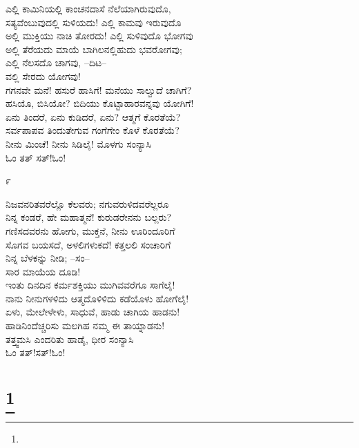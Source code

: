 \begin{myquote}
ಎಲ್ಲಿ ಕಾಮಿನಿಯಲ್ಲಿ ಕಾಂಚನದಾಸೆ ನೆಲೆಯಾಗಿರುವುದೊ,\\ಸತ್ಯವೆಂಬುವುದಲ್ಲಿ ಸುಳಿಯದು! ಎಲ್ಲಿ ಕಾಮವು ಇರುವುದೊ\\ಅಲ್ಲಿ ಮುಕ್ತಿಯು ನಾಚಿ ತೋರದು! ಎಲ್ಲಿ ಸುಳಿವುದೊ ಭೋಗವು\\ಅಲ್ಲಿ ತೆರೆಯದು ಮಾಯೆ ಬಾಗಿಲನಲ್ಲಿಹುದು ಭವರೋಗವು;\\ಎಲ್ಲಿ ನೆಲಸದೊ ಚಾಗವು, –ದಿಟ–\\ವಲ್ಲಿ ಸೇರದು ಯೋಗವು!\\ಗಗನವೇ ಮನೆ! ಹಸುರೆ ಹಾಸಿಗೆ! ಮನೆಯು ಸಾಲ್ವುದೆ ಚಾಗಿಗೆ?\\ಹಸಿಯೊ, ಬಿಸಿಯೋ? ಬಿದಿಯು ಕೊಟ್ಟಾಹಾರವನ್ನವು ಯೋಗಿಗೆ!\\ಏನು ತಿಂದರೆ, ಏನು ಕುಡಿದರೆ, ಏನು? ಆತ್ಮಗೆ ಕೊರತೆಯೆ?\\ಸರ್ವಪಾಪವ ತಿಂದುತೇಗುವ ಗಂಗೆಗೇಂ ಕೊಳೆ ಕೊರತೆಯೆ?\\ನೀನು ಮಿಂಚೆ! ನೀನು ಸಿಡಿಲೈ! ಮೊಳಗು ಸಂನ್ಯಾಸಿ\\ಓಂ ತತ್ ಸತ್!ಓಂ!
\end{myquote}

\begin{center}
೯
\end{center}

\begin{myquote}
ನಿಜವನರಿತವರೆಲ್ಲೊ ಕೆಲವರು; ನಗುವರುಳಿದವರೆಲ್ಲರೂ\\ನಿನ್ನ ಕಂಡರೆ, ಹೇ ಮಹಾತ್ಮನೆ! ಕುರುಡರೇನನು ಬಲ್ಲರು?\\ಗಣಿಸದವರನು ಹೋಗು, ಮುಕ್ತನೆ, ನೀನು ಊರಿಂದೂರಿಗೆ\\ಸೊಗವ ಬಯಸದೆ, ಅಳಲಿಗಳುಕದೆ! ಕತ್ತಲಲಿ ಸಂಚಾರಿಗೆ\\ನಿನ್ನ ಬೆಳಕನ್ನು ನೀಡಿ; –ಸಂ–\\ಸಾರ ಮಾಯೆಯ ದೂಡಿ!\\ಇಂತು ದಿನದಿನ ಕರ್ಮಶಕ್ತಿಯು ಮುಗಿವವರೆಗೂ ಸಾಗೆಲೈ!\\ನಾನು ನೀನುಗಳಳಿದು ಆತ್ಮದೊಳಿಳಿದು ಕಡೆಯೊಳು ಹೋಗೆಲೈ!\\ಏಳು, ಮೇಲೇಳೇಳು, ಸಾಧುವೆ, ಹಾಡು ಚಾಗಿಯ ಹಾಡನು!\\ಹಾಡಿನಿಂದೆಚ್ಚರಿಸು ಮಲಗಿಹ ನಮ್ಮ ಈ ತಾಯ್ನಾಡನು!\\ತತ್ತ್ವಮಸಿ ಎಂದರಿತು ಹಾಡೈ, ಧೀರ ಸಂನ್ಯಾಸಿ\\ಓಂ ತತ್!ಸತ್!ಓಂ!
\end{myquote}

\selecteng

\chapter[MANY HAPPY RETURNS]{\protect\footnote{}}


